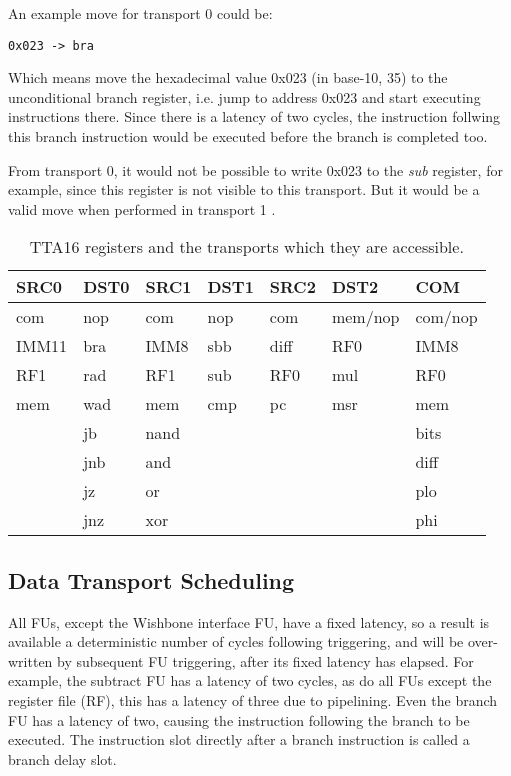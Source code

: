 An example move for transport 0 could be:
\begin{center}
\texttt{0x023	-> bra}
\end{center}
Which means move the hexadecimal value 0x023 (in base-10, 35) to the
unconditional branch register, i.e. jump to address 0x023 and start executing
instructions there. Since there is a latency of two cycles, the instruction
follwing this branch instruction would be executed before the branch is
completed too.

From transport 0, it would not be possible to write 0x023 to the \textit{sub}
register, for example, since this register is not visible to this transport. But
it would be a valid move when performed in transport 1 .

\begin{table}[h!]
\begin{center}
\begin{tabular}{l l | l l | l l | l}
SRC0	& DST0	&	SRC1	& DST1	&	SRC2	&	DST2	&	COM	\\
\hline
com		&	nop	&	com		&	nop	&	com		&	mem/nop	&	com/nop	\\
IMM11	&	bra	&	IMM8	&	sbb	&	diff	&	RF0		&	IMM8\\
RF1		&	rad	&	RF1		&	sub	&	RF0		&	mul		&	RF0	\\
mem		&	wad	&	mem		&	cmp	&	pc		&	msr		&	mem	\\
		&	jb	&	nand	&		&			&			&	bits\\
		&	jnb	&	and		&		&			&			&	diff\\
		&	jz	&	or		&		&			&			&	plo	\\
		&	jnz	&	xor		&		&			&			&	phi	\\
\end{tabular}
\end{center}
\caption[TTA16 registers and the transports to which they have access]{TTA16
registers and the transports which they are accessible.}
\label{TTAPROG_Registers}
\end{table}


\subsection{Data Transport Scheduling}
All FUs, except the Wishbone interface FU, have a fixed latency, so a result is
available a deterministic number of cycles following triggering, and will be
over-written by subsequent FU triggering, after its fixed latency has elapsed.
For example, the subtract FU has a latency of two cycles, as do all FUs except
the register file (RF), this has a latency of three due to pipelining. Even the
branch FU has a latency of two, causing the instruction following the branch to
be executed. The instruction slot directly after a branch instruction is called
a branch delay slot\cite{SPARC_Arch}.

